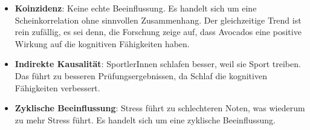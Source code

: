 \begin{myexercise}
\begin{myanswer}
\begin{itemize}
            \item \textbf{Koinzidenz}: Keine echte Beeinflussung. Es handelt sich um eine Scheinkorrelation ohne sinnvollen Zusammenhang. Der gleichzeitige Trend ist rein zufällig, es sei denn, die Forschung zeige auf, dass Avocados eine positive Wirkung auf die kognitiven Fähigkeiten haben.
                  \begin{center}
                  \end{center}

            \item \textbf{Indirekte Kausalität}: SportlerInnen schlafen besser, weil sie Sport treiben. Das führt zu besseren Prüfungsergebnissen, da Schlaf die kognitiven Fähigkeiten verbessert.
                  \begin{center}
                  \end{center}

            \item \textbf{Zyklische Beeinflussung}: Stress führt zu schlechteren Noten, was wiederum zu mehr Stress führt. Es handelt sich um eine zyklische Beeinflussung.
                  \begin{center}
                  \end{center}
        \end{itemize}
    \end{myanswer}
\end{myexercise}

